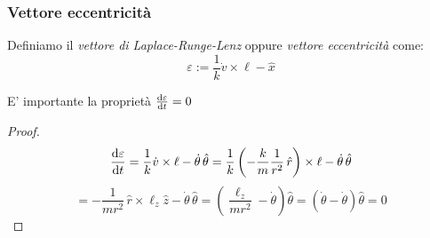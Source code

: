 \subsubsection{Vettore eccentricità}
\begin{definition}
    Definiamo il \textit{vettore di Laplace-Runge-Lenz} oppure \textit{vettore eccentricità} come:
    \begin{equation}
        \varepsilon:= \frac{1}{k}\dot{v}\times\ell - \hat{x}
    \end{equation}
\end{definition}
\begin{proposition}
    E' importante la proprietà $\dv{\varepsilon}{t}=0$
\end{proposition}
\begin{proof}
    \begin{equation*}
        \dv{\varepsilon}{t} = \frac{1}{k} \dot{v} \times \ell - \dot{\theta} \, \hat{\theta} =
        \frac{1}{k} \left( -\frac{k}{m} \frac{1}{r^2} \, \hat{r} \right) \times \ell - \dot{\theta} \, \hat{\theta}
    \end{equation*}
    \begin{equation*}
        = -\frac{1}{m r^2} \, \hat{r} \times \ell_z \hat{z} - \dot{\theta} \, \hat{\theta} = 
        \left( \frac{\ell_z}{m r^2} - \dot{\theta} \right) \hat{\theta} =
        (\dot{\theta} - \dot{\theta}) \hat{\theta} = 0
    \end{equation*}
\end{proof}

